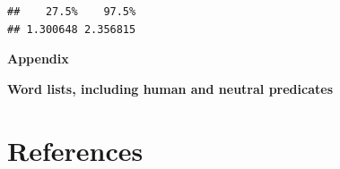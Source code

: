 \documentclass[
  10pt,
  dvipsnames,enabledeprecatedfontcommands]{scrartcl}
\begin{document}
\begin{verbatim}
##    27.5%    97.5% 
## 1.300648 2.356815
\end{verbatim}

\normalsize

\newpage

\noindent \huge  \textbf{Appendix} \normalsize

\noindent \Large \textbf{Word lists, including human and neutral predicates}
\normalsize

\hypertarget{references}{%
\section*{References}\label{references}}

\vspace{-3mm}
\end{document}
